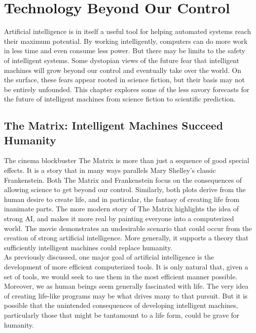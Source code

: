 \chapter{Technology Beyond Our Control}
Artificial intelligence is in itself a useful tool for helping automated systems reach
their maximum potential. By working intelligently, computers can do more work in less
time and even consume less power. But there may be limits to the safety of intelligent
systems. Some dystopian views of the future fear that intelligent machines will grow
beyond our control and eventually take over the world. On the surface, these fears appear
rooted in science fiction, but their basis may not be entirely unfounded. This chapter
explores some of the less savory forecasts for the future of intelligent machines from
science fiction to scientific prediction.
\section{The Matrix: Intelligent Machines Succeed Humanity}
The cinema blockbuster The Matrix is more than just a sequence of good special
effects. It is a story that in many ways parallels Mary Shelley’s classic Frankenstein.
Both The Matrix and Frankenstein focus on the consequences of allowing science to get
beyond our control. Similarly, both plots derive from the human desire to create life, and
in particular, the fantasy of creating life from inanimate parts. The more modern story of
The Matrix highlights the idea of strong AI, and makes it more real by painting everyone
into a computerized world. The movie demonstrates an undesirable scenario that could
occur from the creation of strong artificial intelligence. More generally, it supports a
theory that sufficiently intelligent machines could replace humanity.\\
As previously discussed, one major goal of artificial intelligence is the
development of more efficient computerized tools. It is only natural that, given a set of
tools, we would seek to use them in the most efficient manner possible. Moreover, we as human beings seem generally fascinated with life. The very idea of creating life-like
programs may be what drives many to that pursuit. But it is possible that the unintended
consequences of developing intelligent machines, particularly those that might be
tantamount to a life form, could be grave for humanity.\\


